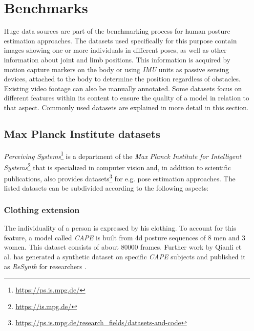 \section{Benchmarks}
\label{sec:benchmarks}
Huge data sources are part of the benchmarking process for human posture estimation approaches. The datasets used specifically for this purpose contain images showing one or more individuals in different poses, as well as other information about joint and limb positions. This information is acquired by motion capture markers on the body or using \emph{IMU} units as passive sensing devices, attached to the body to determine the position regardless of obstacles. Existing video footage can also be manually annotated. Some datasets focus on different features within its content to ensure the quality of a model in relation to that aspect. Commonly used datasets are explained in more detail in this section.

\subsection{Max Planck Institute datasets}
\emph{Perceiving Systems}\footnote{\url{https://ps.is.mpg.de/}} is a department of the \emph{Max Planck Institute for Intelligent Systems}\footnote{\url{https://is.mpg.de/}} that is specialized in computer vision and, in addition to scientific publications, also provides datasets\footnote{\url{https://ps.is.mpg.de/research_fields/datasets-and-code}} for e.g. pose estimation approaches. The listed datasets can be subdivided according to the following aspects:

\subsubsection{Clothing extension}
The individuality of a person is expressed by his clothing. To account for this feature, a model called \emph{CAPE} is built from 4d posture sequences of 8 men and 3 women. This dataset consists of about 80000 frames. \cite{cape}
Further work by Qianli et al. has generated a synthetic dataset on specific \emph{CAPE} subjects and published it as \emph{ReSynth} for researchers \cite{resynth}.


